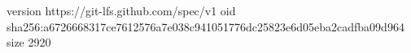 version https://git-lfs.github.com/spec/v1
oid sha256:a6726668317ce7612576a7e038c941051776dc25823e6d05eba2cadfba09d964
size 2920
